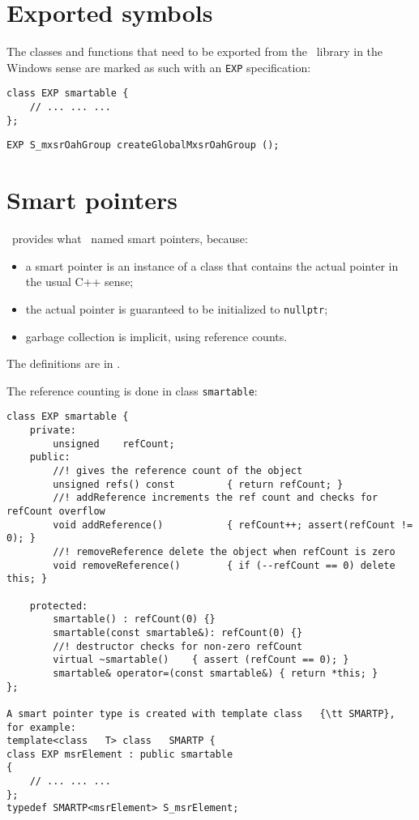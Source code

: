 \section{Exported symbols}

The classes and functions that need to be exported from the \mf\ library in the Windows sense are marked as such with an {\tt EXP} specification:
\begin{lstlisting}[language=CPlusPlus]
class EXP smartable {
	// ... ... ...
};
\end{lstlisting}

\begin{lstlisting}[language=CPlusPlus]
EXP S_mxsrOahGroup createGlobalMxsrOahGroup ();
\end{lstlisting}


\section{Smart pointers}

\libmusicxml\ provides what \fober\ named smart pointers, because:
\begin{itemize}
\item a smart pointer is an instance of a class   that contains the actual pointer in the usual C++ sense;
\item the actual pointer is guaranteed to be initialized to {\tt nullptr};
\item garbage collection is implicit, using reference counts.
\end{itemize}
The definitions are in .

The reference counting is done in class   {\tt smartable}:
\begin{lstlisting}[language=CPlusPlus]
class EXP smartable {
	private:
		unsigned 	refCount;
	public:
		//! gives the reference count of the object
		unsigned refs() const         { return refCount; }
		//! addReference increments the ref count and checks for refCount overflow
		void addReference()           { refCount++; assert(refCount != 0); }
		//! removeReference delete the object when refCount is zero
		void removeReference()		  { if (--refCount == 0) delete this; }

	protected:
		smartable() : refCount(0) {}
		smartable(const smartable&): refCount(0) {}
		//! destructor checks for non-zero refCount
		virtual ~smartable()    { assert (refCount == 0); }
		smartable& operator=(const smartable&) { return *this; }
};

A smart pointer type is created with template class   {\tt SMARTP}, for example:
template<class   T> class   SMARTP {
class EXP msrElement : public smartable
{
	// ... ... ...
};
typedef SMARTP<msrElement> S_msrElement;

\end{lstlisting}

